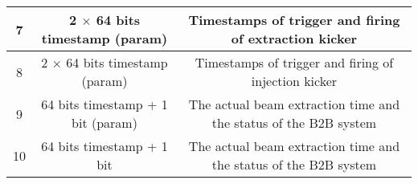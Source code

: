 \begin{landscape}
\begin{table}[!htb]
\begin{center}
\begin{tabular}{ | c | c | c | c | c | c |}
7&	\multicolumn{3}{c|}{2 $\times$ 64 bits timestamp (param)} &\multicolumn{2}{c|}{ Timestamps of trigger and firing of extraction kicker}\\ \hline
8&	\multicolumn{3}{c|}{2 $\times$ 64 bits timestamp (param)} &	\multicolumn{2}{c|}{Timestamps of trigger and firing of injection kicker}\\ \hline

9&	\multicolumn{3}{c|}{64 bits timestamp + 1 bit (param)}&	\multicolumn{2}{c|}{The actual beam extraction time and the status of the B2B system}  \\ \hline

10& \multicolumn{3}{c|}{64 bits timestamp + 1 bit}	&	\multicolumn{2}{c|}{The actual beam extraction time and the status of the B2B system} \\ \hline

    \end{tabular}
\end{center}
\end{table}
\end{landscape} 